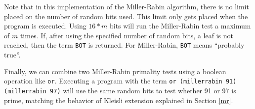 Note that in this implementation of the Miller-Rabin algorithm, there is no limit placed on the number of random bits used.  This limit only gets placed when the program is executed. Using $16*m$ bits will run the Miller-Rabin test a maximum of $m$ times.  If, after using the specified number of random bits, a leaf is not reached, then the term \texttt{BOT} is returned.  For Miller-Rabin, \texttt{BOT} means ``probably true''.

Finally, we can combine two Miller-Rabin primality tests using a boolean operation like \texttt{or}.  Executing a program with the term \texttt{or (millerrabin 91) (millerrabin 97)} will use the same random bits to test whether 91 or 97 is prime, matching the behavior of Kleisli extension explained in Section \ref{mr}.